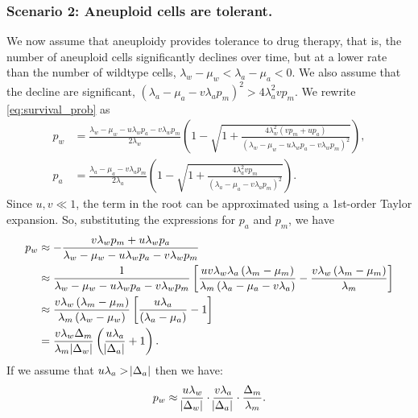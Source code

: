 \documentclass[12pt]{extarticle}
\begin{document}
\begin{appendices}
\subsubsection*{Scenario 2: Aneuploid cells are tolerant.} 

We now assume that aneuploidy provides tolerance to drug therapy, that is, the number of aneuploid cells significantly declines over time, but at a lower rate than the number of wildtype cells, $\lambda_w - \mu_w < \lambda_a - \mu_a < 0$. We also assume that the decline are significant, $\left(\lambda_a-\mu_a-v\lambda_ap_m\right)^2 > 4\lambda_a^2 v p_m$.
We rewrite \cref{eq:survival_prob} as
\begin{equation}
\begin{aligned}
p_w&=\frac{\lambda_w-\mu_w-u\lambda_wp_a-v\lambda_wp_m}{2\lambda_w}\left(1-\sqrt{1+\frac{4\lambda_w^2\left(vp_m+up_a\right)}{\left(\lambda_w-\mu_w-u\lambda_wp_a-v\lambda_wp_m\right)^2}}\right), \\
p_a&=\frac{\lambda_a-\mu_a-v\lambda_ap_m}{2\lambda_a}\left(1-\sqrt{1+\frac{4\lambda_a^2vp_m}{\left(\lambda_a-\mu_a-v\lambda_ap_m\right)^2}}\right) .
\end{aligned}
\end{equation}
Since $u,v\ll1$, the term in the root can be approximated using a 1st-order Taylor expansion. So, substituting the expressions for $p_a$ and $p_m$, we have
\begin{equation} \label{eq:survprobwinitial}
\begin{aligned}
p_w&\approx-\frac{v\lambda_wp_m+u\lambda_wp_a}{\lambda_w-\mu_w-u\lambda_wp_a-v\lambda_wp_m}\\
&\approx\frac{1}{\lambda_w-\mu_w-u\lambda_wp_a-v\lambda_wp_m}\left[\frac{uv\lambda_w\lambda_a\left(\lambda_m-\mu_m\right)}{\lambda_m\left(\lambda_a-\mu_a-v\lambda_a\right)}-\frac{v\lambda_w\left(\lambda_m-\mu_m\right)}{\lambda_m}\right]\\ %
&\approx\frac{v\lambda_w\left(\lambda_m-\mu_m\right)}{\lambda_m\left(\lambda_w-\mu_w\right)}\left[\frac{u\lambda_a}{\left(\lambda_a-\mu_a\right)}-1\right] \\
&=\frac{v\lambda_w\Delta_m}{\lambda_m \abs{\Delta_w}}\left(\frac{u\lambda_a}{\abs{\Delta_a}}+1\right) .
\end{aligned}
\end{equation}
If we assume that $u\lambda_a>\abs{\Delta_a}$ then we have:
\begin{equation}\label{eq:pw_tolerant}
p_w\approx\frac{u\lambda_w}{\abs{\Delta_w}}\cdot\frac{v\lambda_a}{\abs{\Delta_a}}\cdot\frac{\Delta_m}{\lambda_m}.
\end{equation}


\end{appendices}
\end{document}
